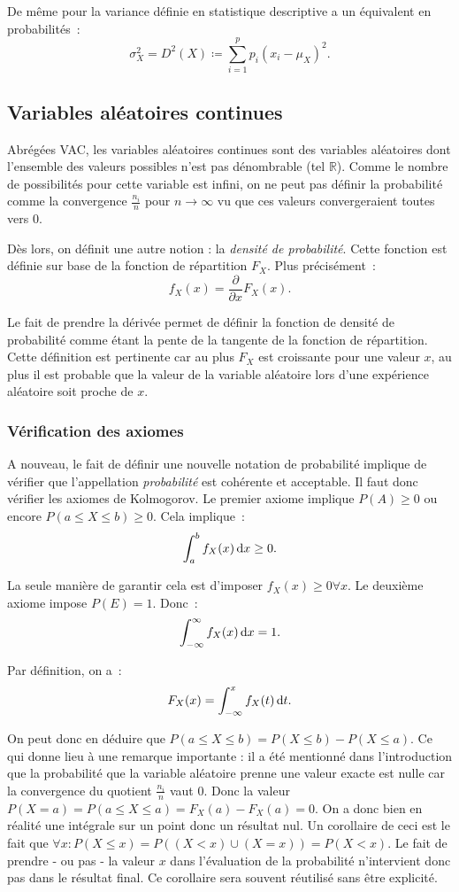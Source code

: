 \documentclass{article}
\renewcommand{\pd}[1]{\frac {\partial}{\partial #1}}
\begin{document}
			De même pour la variance définie en statistique descriptive a un équivalent en probabilités~:
			\[\sigma_X^2 = D^2(X) \coloneqq \sum_{i=1}^pp_i(x_i-\mu_X)^2.\]

	\subsection{Variables aléatoires continues}
		Abrégées VAC, les variables aléatoires continues sont des variables aléatoires dont l'ensemble des valeurs possibles n'est pas dénombrable (tel $\mathbb R$).
		Comme le nombre de possibilités pour cette variable est infini, on ne peut pas définir la probabilité comme la convergence $\frac {n_i}n$ pour $n \to \infty$
		vu que ces valeurs convergeraient toutes vers $0$.

		Dès lors, on définit une autre notion : la \textit{densité de probabilité}. Cette fonction est définie sur base de la fonction de répartition $F_X$. Plus
		précisément~:
		\[f_X(x) = \pd{x}F_X(x).\]

		Le fait de prendre la dérivée permet de définir la fonction de densité de probabilité comme étant la pente de la tangente de la fonction de répartition. Cette
		définition est pertinente car au plus $F_X$ est croissante pour une valeur $x$, au plus il est probable que la valeur de la variable aléatoire lors d'une
		expérience aléatoire soit proche de $x$.

		\subsubsection{Vérification des axiomes}
			A nouveau, le fait de définir une nouvelle notation de probabilité implique de vérifier que l'appellation \textit{probabilité} est cohérente et acceptable.
			Il faut donc vérifier les axiomes de Kolmogorov. Le premier axiome implique $P(A) \geq 0$ ou encore $P(a \leq X \leq b) \geq 0$. Cela implique~:
			\[\int_a^bf_X(x)\dif x \geq 0.\]

			La seule manière de garantir cela est d'imposer $f_X(x) \geq 0 \forall x$. Le deuxième axiome impose $P(E) = 1$. Donc~:
			\[\int_{-\infty}^\infty f_X(x)\dif x = 1.\]

			Par définition, on a~:
			\[F_X(x) = \int_{-\infty}^xf_X(t)\dif t.\]

			On peut donc en déduire que $P(a \leq X \leq b) = P(X \leq b) - P(X \leq a)$. Ce qui donne lieu à une remarque importante : il a été mentionné dans
			l'introduction que la probabilité que la variable aléatoire prenne une valeur exacte est nulle car la convergence du quotient $\frac {n_i}n$ vaut $0$. Donc
			la valeur $P(X = a) = P(a \leq X \leq a) = F_X(a) - F_X(a) = 0$. On a donc bien en réalité une intégrale sur un point donc un résultat nul. Un corollaire de
			ceci est le fait que $\forall x : P(X \leq x) = P((X < x) \cup (X = x)) = P(X < x)$. Le fait de prendre - ou pas - la valeur $x$ dans l'évaluation de la
			probabilité n'intervient donc pas dans le résultat final. Ce corollaire sera souvent réutilisé sans être explicité.
\end{document}
